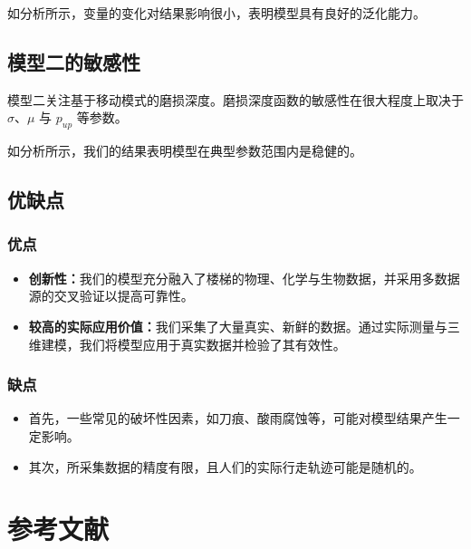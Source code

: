 \documentclass[11pt,a4paper]{ctexart}
\begin{document}
如分析所示，变量的变化对结果影响很小，表明模型具有良好的泛化能力。

\subsection{模型二的敏感性}

模型二关注基于移动模式的磨损深度。磨损深度函数的敏感性在很大程度上取决于 $\sigma$、$\mu$ 与 $p_{up}$ 等参数。

如分析所示，我们的结果表明模型在典型参数范围内是稳健的。

\subsection{优缺点}

\subsubsection{优点}

\begin{itemize}[itemsep=1pt,topsep=2pt]
\item \textbf{创新性：}我们的模型充分融入了楼梯的物理、化学与生物数据，并采用多数据源的交叉验证以提高可靠性。
\item \textbf{较高的实际应用价值：}我们采集了大量真实、新鲜的数据。通过实际测量与三维建模，我们将模型应用于真实数据并检验了其有效性。
\end{itemize}

\subsubsection{缺点}

\begin{itemize}[itemsep=1pt,topsep=2pt]
\item 首先，一些常见的破坏性因素，如刀痕、酸雨腐蚀等，可能对模型结果产生一定影响。
\item 其次，所采集数据的精度有限，且人们的实际行走轨迹可能是随机的。
\end{itemize}

\newpage
\section*{参考文献}
\end{document}
